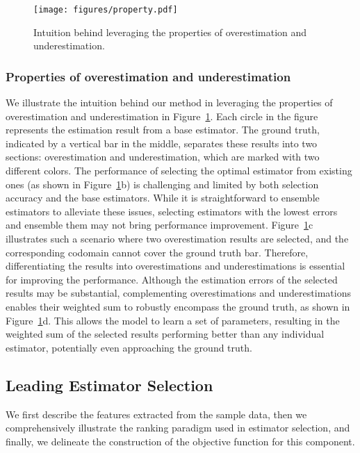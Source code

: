 \begin{figure}[t]
    \centering
    \texttt{[image: figures/property.pdf]}
    \caption{Intuition behind leveraging the properties of overestimation and underestimation.}
    \label{fig:properties}
\end{figure}


\subsubsection{Properties of overestimation and underestimation}\label{sec:motivation}
We illustrate the intuition behind our method in leveraging the properties of overestimation and underestimation in Figure~\ref{fig:properties}. Each circle in the figure represents the estimation result from a base estimator. The ground truth, indicated by a vertical bar in the middle, separates these results into two sections: overestimation and underestimation, which are marked with two different colors.
The performance of selecting the optimal estimator from existing ones (as shown in Figure~\ref{fig:properties}b) is challenging and limited by both selection accuracy and the base estimators. 
While it is straightforward to ensemble estimators to alleviate these issues, selecting estimators with the lowest errors and ensemble them may not bring performance improvement. Figure~\ref{fig:properties}c illustrates such a scenario where two overestimation results are selected, and the corresponding codomain cannot cover the ground truth bar.
Therefore, differentiating the results into overestimations and underestimations is essential for improving the performance. Although the estimation errors of the selected results may be substantial, complementing overestimations and underestimations enables their weighted sum to robustly encompass the ground truth, as shown in Figure~\ref{fig:properties}d. This allows the model to learn a set of parameters, resulting in the weighted sum of the selected results performing better than any individual estimator, potentially even approaching the ground truth.











\subsection{Leading Estimator Selection}\label{sec:leading}
We first describe the features extracted from the sample data, then we comprehensively illustrate the ranking paradigm used in estimator selection, and finally, we delineate the construction of the objective function for this component.



